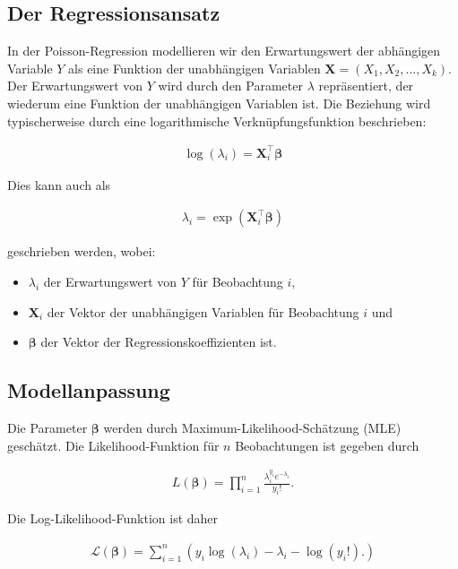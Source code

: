 \documentclass[
  a4paper,
  DIV=11,
  oneside]{scrreprt}
\begin{document}
\subsection{Der Regressionsansatz}\label{der-regressionsansatz}

In der Poisson-Regression modellieren wir den Erwartungswert der
abhängigen Variable \(Y\) als eine Funktion der unabhängigen Variablen
\(\mathbf{X} = (X_1, X_2, \ldots, X_k)\). Der Erwartungswert von \(Y\)
wird durch den Parameter \(\lambda\) repräsentiert, der wiederum eine
Funktion der unabhängigen Variablen ist. Die Beziehung wird
typischerweise durch eine logarithmische Verknüpfungsfunktion
beschrieben:

\begin{align}
\log(\lambda_i) = \mathbf{X}_i^\top \boldsymbol{\beta}
\end{align}

Dies kann auch als

\begin{align}
\lambda_i = \exp(\mathbf{X}_i^\top \boldsymbol{\beta})
\end{align}

geschrieben werden, wobei:

\begin{itemize}
\item
  \(\lambda_i\) der Erwartungswert von \(Y\) für Beobachtung \(i\),
\item
  \(\mathbf{X}_i\) der Vektor der unabhängigen Variablen für Beobachtung
  \(i\) und
\item
  \(\boldsymbol{\beta}\) der Vektor der Regressionskoeffizienten ist.
\end{itemize}

\subsection{Modellanpassung}\label{modellanpassung}

Die Parameter \(\boldsymbol{\beta}\) werden durch
Maximum-Likelihood-Schätzung (MLE) geschätzt. Die Likelihood-Funktion
für \(n\) Beobachtungen ist gegeben durch

\begin{align}
L(\boldsymbol{\beta}) = \prod_{i=1}^n \frac{\lambda_i^{y_i} e^{-\lambda_i}}{y_i!}.
\end{align}

Die Log-Likelihood-Funktion ist daher

\begin{align}
\mathcal{L}(\boldsymbol{\beta}) = \sum_{i=1}^n \left( y_i \log(\lambda_i) - \lambda_i - \log(y_i!). \right)
\end{align}
\end{document}
